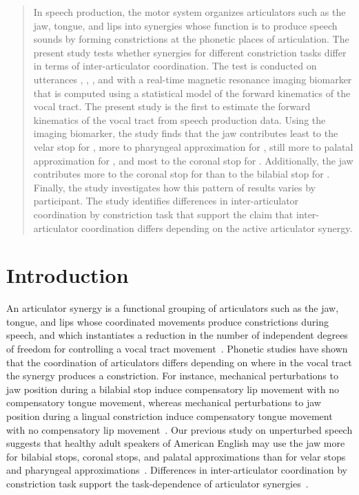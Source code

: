\documentclass[preprint]{JASAnew}\usepackage[]{graphicx}\usepackage[]{color}
\begin{document}
\begin{abstract}
In speech production, the motor system organizes articulators such as the jaw, tongue, and lips into synergies whose function is to produce speech sounds by forming constrictions at the phonetic places of articulation.
%
The present study tests whether synergies for different constriction tasks differ in terms of inter-articulator coordination.
%
The test is conducted on utterances \textipa{[ApA]}, \textipa{[AtA]}, \textipa{[AiA]}, and \textipa{[AkA]} with a real-time magnetic resonance imaging biomarker that is computed using a statistical model of the forward kinematics of the vocal tract. 
%
The present study is the first to estimate the forward kinematics of the vocal tract from speech production data.
%
Using the imaging biomarker, the study finds that the jaw contributes 
least to the velar stop for \textipa{[k]},
more to pharyngeal approximation for \textipa{[A]}, 
still more to palatal approximation for \textipa{[i]},
and most to the coronal stop for \textipa{[t]}.
%
Additionally, the jaw contributes more to the coronal stop for \textipa{[t]} than to the bilabial stop for \textipa{[p]}.
%
Finally, the study investigates how this pattern of results varies by participant.
%
The study identifies differences in inter-articulator coordination by constriction task that support the claim that inter-articulator coordination differs depending on the active articulator synergy.
\end{abstract}


\maketitle


\section{Introduction}

An articulator synergy is a functional grouping of articulators such as the jaw, tongue, and lips whose coordinated movements produce constrictions during speech, and which instantiates a reduction in the number of independent degrees of freedom for controlling a vocal tract movement~\cite{turvey1977preliminaries}.
%
Phonetic studies have shown that the coordination of articulators differs depending on where in the vocal tract the synergy produces a constriction. 
%
For instance, mechanical perturbations to jaw position during a bilabial stop induce compensatory lip movement with no compensatory tongue movement, 
%
whereas mechanical perturbations to jaw position during a lingual constriction induce compensatory tongue movement with no compensatory lip movement~\citep{kelso1984functionally}. 
%
Our previous study on unperturbed speech suggests that healthy adult speakers of American English may use the jaw more for bilabial stops, coronal stops, and palatal approximations than for velar stops and pharyngeal approximations~\citep{Sorensen+2016}. 
%
Differences in inter-articulator coordination by constriction task support the task-dependence of articulator synergies~\citep{latash2008synergy}. 
\end{document}
